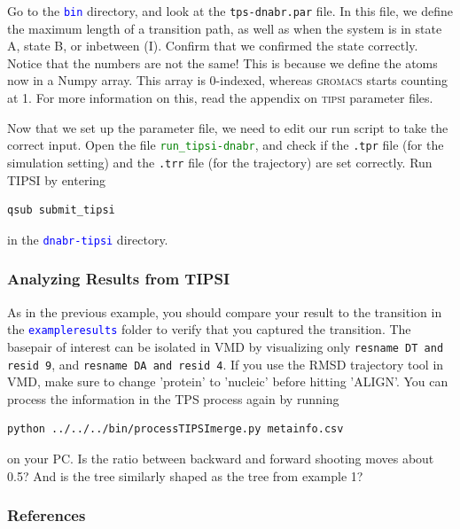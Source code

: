 \documentclass[]{article}
\begin{document}
Go to the \textcolor{blue}{\texttt{bin}} directory, and look at the \texttt{tps-dnabr.par} file. In this file, we define the maximum length of a transition path, as well as when the system is in state A, state B, or inbetween (I). Confirm that we confirmed the state correctly. Notice that the numbers are not the same! This is because we define the atoms now in a Numpy array. This array is 0-indexed, whereas \textsc{gromacs} starts counting at 1. For more information on this, read the appendix on \textsc{tipsi} parameter files.

Now that we set up the parameter file, we need to edit our run script to take the correct input. Open the file \textcolor{green}{\texttt{run\_tipsi-dnabr}}, and check if the \texttt{.tpr} file (for the simulation setting) and the \texttt{.trr} file (for the trajectory) are set correctly. Run \textsc{TIPSI} by entering
%
\begin{lstlisting}
qsub submit_tipsi
\end{lstlisting}
%
in the \textcolor{blue}{\texttt{dnabr-tipsi}} directory.

\subsubsection*{Analyzing Results from TIPSI}

As in the previous example, you should compare your result to the transition in the \textcolor{blue}{\texttt{exampleresults}} folder to verify that you captured the transition. The basepair of interest can be isolated in \textsc{VMD} by visualizing only \texttt{resname DT and resid 9}, and \texttt{resname DA and resid 4}. If you use the RMSD trajectory tool in VMD, make sure to change 'protein' to 'nucleic' before hitting 'ALIGN'. You can process the information in the TPS process again by running
%
\begin{lstlisting}
python ../../../bin/processTIPSImerge.py metainfo.csv
\end{lstlisting}
% 
on your PC. Is the ratio between backward and forward shooting moves about 0.5? And is the tree similarly shaped as the tree from example 1?

\subsubsection*{References}




\newpage
\end{document}
